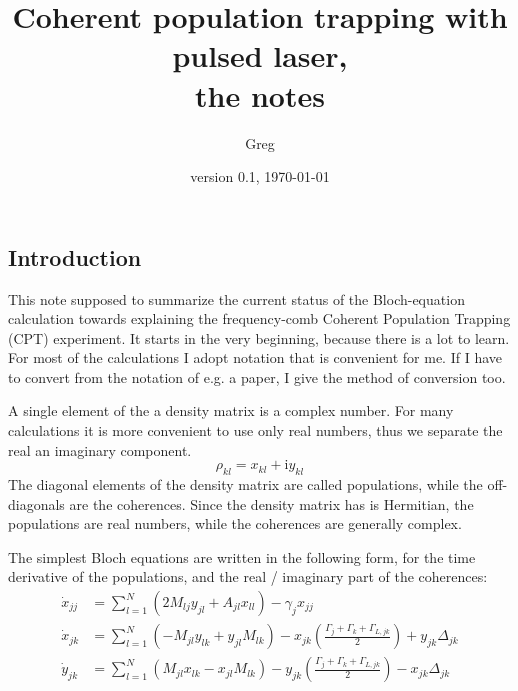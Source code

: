 \documentclass{article}
\title{Coherent population trapping with pulsed laser,\\the notes}
\author{Greg}
\date{version 0.1, \today}
\newcommand{\ComplexUnit}{\ensuremath{\mathrm{i}}}
\begin{document}
\begin{spacing}{1.1}
\maketitle
\tableofcontents
\newpage


\section{Introduction}
This note supposed to summarize the current status of the Bloch-equation calculation towards explaining the frequency-comb Coherent Population Trapping (CPT) experiment. It starts in the very beginning, because there is a lot to learn. For most of the calculations I adopt notation that is convenient for me. If I have to convert from the notation of e.g. a paper, I give the method of conversion too. 

A single element of the a density matrix is a complex number. For many calculations it is more convenient to use only real numbers, thus we separate the real an imaginary component.
\begin{equation}
\rho_{kl} = x_{kl} + \ComplexUnit y_{kl}
\end{equation}
The diagonal elements of the density matrix are called populations, while the off-diagonals are the coherences. Since the density matrix has is Hermitian, the populations are real numbers, while the coherences are generally complex.

The simplest Bloch equations are written in the following form, for the time derivative of the  populations, and the real / imaginary part of the coherences:
\begin{subequations}
\begin{align}
\dot x_{jj} &= \sum_{l=1}^N (2 M_{lj} y_{jl} + A_{jl} x_{ll}) - \gamma_j x_{jj} \\
\dot x_{jk} &= \sum_{l=1}^N (- M_{jl} y_{lk} + y_{jl} M_{lk}) - x_{jk} \left(\frac{\Gamma_j + \Gamma_k + \Gamma_{L,jk}}{2}\right) + y_{jk} \Delta_{jk} \\
\dot y_{jk} &= \sum_{l=1}^N (  M_{jl} x_{lk} - x_{jl} M_{lk}) - y_{jk} \left(\frac{\Gamma_j + \Gamma_k + \Gamma_{L,jk}}{2}\right) - x_{jk} \Delta_{jk}
\end{align}
\end{subequations}



\end{spacing}
\end{document}
